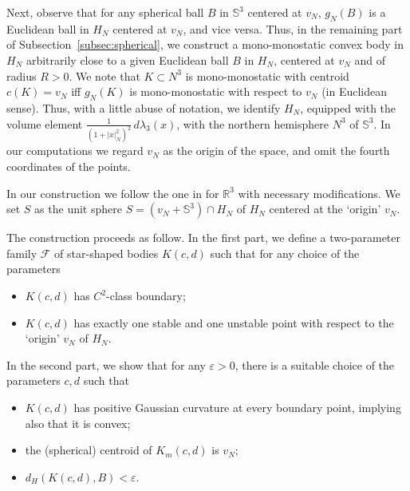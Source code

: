 \documentclass[twoside]{amsart}
\theoremstyle{plain}
\theoremstyle{definition}
\numberwithin{equation}{section}
\renewcommand{\Re}{\mathbb R}
\newcommand{\Sph}{\mathbb{S}}
\begin{document}
Next, observe that for any spherical ball $B$ in $\Sph^3$ centered at $v_N$, $g_N(B)$ is a Euclidean ball in $H_N$ centered at $v_N$, and vice versa. Thus, in the remaining part of Subsection~\ref{subsec:spherical}, we construct a mono-monostatic convex body in $H_N$ arbitrarily close to a given Euclidean ball $B$ in $H_N$, centered at $v_N$ and of radius $R > 0$. We note that $K \subset N^3$ is mono-monostatic with centroid $c(K)=v_N$ iff $g_N(K)$ is mono-monostatic with respect to $v_N$ (in Euclidean sense). Thus, with a little abuse of notation, we identify $H_N$, equipped with the volume element $\frac{1}{\left( 1+ |x|_N^2 \right)^2} \, d \lambda_3(x)$, with the northern hemisphere $N^3$ of $\Sph^3$. In our computations we regard $v_N$ as the origin of the space, and omit the fourth coordinates of the points. %

In our construction we follow the one in \cite{DLV} for $\Re^3$ with necessary modifications. We set $S$ as the unit sphere $S=(v_N + \Sph^3) \cap H_N$ of $H_N$ centered at the `origin' $v_N$.%

The construction proceeds as follow. In the first part, we define a two-parameter family $\mathcal{F}$ of star-shaped bodies $K(c,d)$ such that for any choice of the parameters
\begin{itemize}
\item[(A)] $K(c,d)$ has $C^2$-class boundary;
\item[(B)] $K(c,d)$ has exactly one stable and one unstable point with respect to the `origin' $v_N$ of $H_N$.
\end{itemize}    
In the second part, we show that for any $\varepsilon > 0$, there is a suitable choice of the parameters $c,d$ such that
\begin{itemize}
\item[(C)] $K(c,d)$ has positive Gaussian curvature at every boundary point, implying also that it is convex;
\item[(D)] the (spherical) centroid of $K_m(c,d)$ is $v_N$;
\item[(E)] $d_H(K(c,d), B) < \varepsilon$.
\end{itemize}
\end{document}
